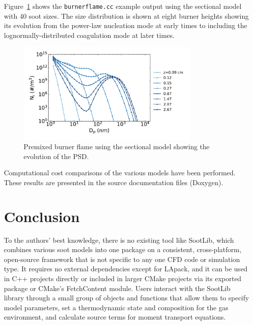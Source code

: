 \documentclass[preprint,letterpaper]{elsarticle}
\begin{document}
Figure~\ref{f:sectional} shows the \texttt{burner\textunderscore flame.cc} example output using the sectional model with 40 soot sizes. The size distribution is shown at eight burner heights showing its evolution from the power-law nucleation mode at early times to including the lognormally-distributed coagulation mode at later times.
%
\begin{figure}
    \begin{center}
        \includegraphics[width=0.8\textwidth]{fig_sectional.pdf}
    \end{center}
    \caption{Premixed burner flame using the sectional model showing the evolution of the PSD.}
    \label{f:sectional}
\end{figure}
%

Computational cost comparisons of the various models have been performed. These results are presented in the source documentation files (Doxygen).


\section{Conclusion}
\label{s:soot-conclusion}

To the authors' best knowledge, there is no existing tool like SootLib, which combines various soot models into one package on a consistent, cross-platform, open-source framework that is not specific to any one CFD code or simulation type. It requires no external dependencies except for LApack, and it can be used in C++ projects directly or included in larger CMake projects via its exported package or CMake's FetchContent module. Users interact with the SootLib library through a small group of objects and functions that allow them to specify model parameters, set a thermodynamic state and composition for the gas environment, and calculate source terms for moment transport equations.
\end{document}
